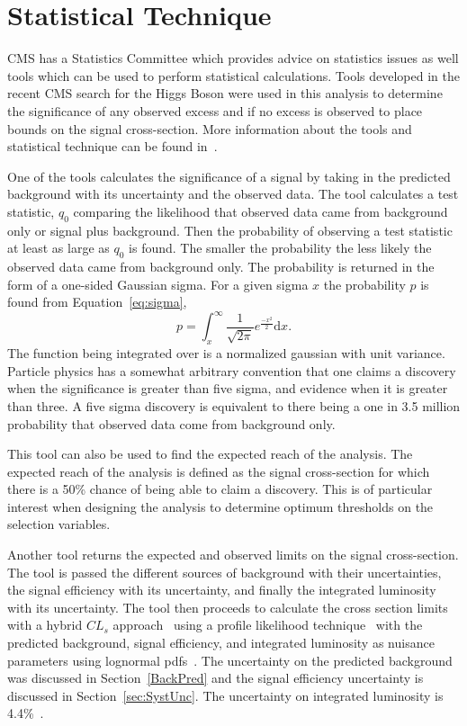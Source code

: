 \section{Statistical Technique \label{sec:stats}}
CMS has a Statistics Committee which provides advice on statistics issues as well tools which can be used to perform statistical calculations.
Tools developed in the recent CMS search for the Higgs Boson were used
in this analysis to determine the significance of any observed excess and if no excess is observed to place bounds on the signal cross-section.
More information about the tools and statistical technique can be found in~\cite{Chatrchyan:2013lba}.

One of the tools calculates the significance of a signal by taking in the predicted background with its uncertainty and the observed data.
The tool calculates a test statistic, $q_0$ comparing the likelihood that observed data came from background only or signal plus background.
Then the probability of observing a test statistic at least as large as $q_0$ is found.
The smaller the probability the less likely the observed data came from background only.
The probability is returned in the form of a one-sided Gaussian sigma. For a given sigma $x$ the probability $p$ is found from Equation~\ref{eq:sigma},
\begin{equation}
p = \int_x^{\infty} \frac{1}{\sqrt{2\pi}}e^{\frac{-x^2}{2}} \mathrm{d} x.
\label{eq:sigma}
\end{equation}
The function being integrated over is a normalized gaussian with unit variance. Particle physics has a somewhat arbitrary 
convention that one claims a discovery when the significance
is greater than five sigma, and evidence when it is greater than three. A five sigma discovery is equivalent to there being a one in 3.5 million probability that
observed data come from background only.

This tool can also be used to find the expected reach of the analysis. The expected reach of the analysis is defined as the signal cross-section
for which there is a 50\% chance of being able to claim a discovery.
This is of particular interest when designing the analysis to determine optimum thresholds on the selection variables.

Another tool returns the expected and observed limits on the signal cross-section. The tool is passed the different sources of background with their uncertainties,
the signal efficiency with its uncertainty, and finally the integrated luminosity with its uncertainty. The tool then proceeds to calculate the cross section limits with
a hybrid $CL_s$ approach~\cite{Read:451614} using a profile likelihood technique~\cite{Cowan:2010js} with the predicted background, signal efficiency, and integrated luminosity
as nuisance parameters using lognormal pdfs~\cite{Eadie,James}. The uncertainty on the predicted background was discussed in Section~\ref{BackPred} and the
signal efficiency uncertainty is discussed in Section~\ref{sec:SystUnc}. The uncertainty on integrated luminosity is 4.4\%~\cite{SMP-12-008}.